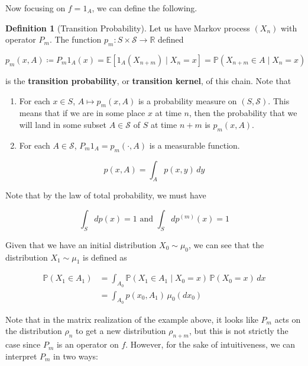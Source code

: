 \documentclass{article}
\theoremstyle{definition}
\theoremstyle{remark}
\theoremstyle{definition}
\newtheorem{definition}{Definition}[section]
\begin{document}
  Now focusing on $f = 1_A$, we can define the following. 

  \begin{definition}[Transition Probability]
    Let us have Markov process $(X_n)$ with operator $P_m$. The function $p_m: S \times \mathcal{S} \rightarrow \mathbb{R}$ defined 

      \[p_m(x, A) \coloneqq P_m 1_A (x) = \mathbb{E}[ 1_A (X_{n+m}) \mid X_n = x] = \mathbb{P}(X_{n + m} \in A \mid X_n = x)\]

    is the \textbf{transition probability}, or \textbf{transition kernel}, of this chain. Note that 

    \begin{enumerate}
      \item For each $x \in S$, $A \mapsto p_m(x, A)$ is a probability measure on $(S, \mathcal{S})$. This means that if we are in some place $x$ at time $n$, then the probability that we will land in some subset $A \in \mathcal{S}$ of $S$ at time $n+m$ is $p_m(x, A)$. 
      \item For each $A \in \mathcal{S}$, $P_m 1_A = p_m (\cdot, A)$ is a measurable function. 
    \end{enumerate}



      \[p(x, A) = \int_A p(x, y) \,dy\]
  \end{definition}

  Note that by the law of total probability, we must have 

    \[\int_S dp(x) = 1 \text{ and } \int_S dp^{(m)} (x) = 1\]

  Given that we have an initial distribution $X_0 \sim \mu_0$, we can see that the distribution $X_1 \sim \mu_1$ is defined as 

  \begin{align*}
    \mathbb{P}(X_1 \in A_1) & = \int_{A_0} \mathbb{P}(X_1 \in A_1 \mid X_0 = x) \, \mathbb{P}(X_0 = x) \,dx \\
    & = \int_{A_0} p(x_0, A_1) \, \mu_0 (d x_0) 
  \end{align*}

  Note that in the matrix realization of the example above, it looks like $P_m$ acts on the distribution $\rho_n$ to get a new distribution $\rho_{n + m}$, but this is not strictly the case since $P_m$ is an operator on $f$. However, for the sake of intuitiveness, we can interpret $P_m$ in two ways: 
\end{document}

